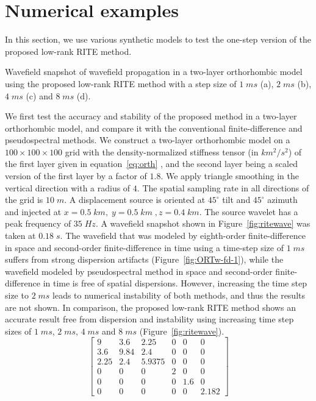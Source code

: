 \section{Numerical examples}
In this section, we use various synthetic models to test the one-step version of the proposed low-rank RITE method.

 {Wavefield snapshot of wavefield propagation in a two-layer orthorhombic model using the proposed low-rank RITE method with a step size of $1\;ms$ (a), $2\;ms$ (b), $4\;ms$ (c) and $8\;ms$ (d). \label{fig:ritewave}}

We first test the accuracy and stability of the proposed method in a two-layer orthorhombic model, and compare it with the conventional finite-difference and pseudospectral methods. We construct a two-layer orthorhombic model on a $100\times100\times100$ grid with the density-normalized stiffness tensor (in $km^2/s^2$) of the first layer given in equation~\ref{eq:orth} \cite[]{schoenberg97}, and the second layer being a scaled version of the first layer by a factor of $1.8$. We apply triangle smoothing in the vertical direction with a radius of $4$. The spatial sampling rate in all directions of the grid is $10\;m$. A displacement source is oriented at $45^{\circ}$ tilt and $45^{\circ}$ azimuth and injected at $x=0.5\;km,\;y=0.5\;km\;,z=0.4\;km$. The source wavelet has a peak frequency of $35\;Hz$. A wavefield snapshot shown in Figure~\ref{fig:ritewave} was taken at $0.18\;s$. The wavefield that was modeled by eighth-order finite-difference in space and second-order finite-difference in time using a time-step size of $1\;ms$ suffers from strong dispersion artifacts (Figure~\ref{fig:ORTw-fd-1}), while the wavefield modeled by pseudospectral method in space and second-order finite-difference in time is free of spatial dispersions. However, increasing the time step size to $2\;ms$ leads to numerical instability of both methods, and thus the results are not shown. In comparison, the proposed low-rank RITE method shows an accurate result free from dispersion and instability using increasing time step sizes of $1\;ms$, $2\;ms$, $4\;ms$ and $8\;ms$ (Figure~\ref{fig:ritewave}).
\begin{equation}
\label{eq:orth}
\begin{bmatrix}
  9    & 3.6  & 2.25   & 0 & 0   & 0 \\
  3.6  & 9.84 & 2.4    & 0 & 0   & 0 \\
  2.25 & 2.4  & 5.9375 & 0 & 0   & 0 \\
  0    & 0    & 0      & 2 & 0   & 0 \\
  0    & 0    & 0      & 0 & 1.6 & 0 \\
  0    & 0    & 0      & 0 & 0   & 2.182
\end{bmatrix}
\end{equation}

